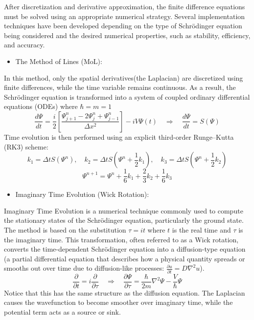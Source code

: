 \documentclass[11pt]{article}
\begin{document}
After discretization and derivative approximation, the finite difference equations must be solved using an appropriate numerical strategy. Several implementation techniques have been developed depending on the type of Schrödinger equation being considered and the desired numerical properties, such as stability, efficiency, and accuracy.

\begin{itemize}
	\item 
	The Method of Lines (MoL):
\end{itemize}
In this method, only the spatial derivatives(the Laplacian) are discretized using finite differences, while the time variable remains continuous. As a result, the Schrödinger equation is transformed into a system of coupled ordinary differential equations (ODEs) where $\hbar = m = 1$
\begin{equation}
	 \frac{d \Psi}{dt} = \frac{i}{2} \left[ \frac{\Psi_{j+1}^n - 2 \Psi_j^n + \Psi_{j-1}^n}{\Delta x^2} \right] - i V \Psi(t) \quad \Rightarrow \quad
	 \frac{d \Psi}{dt} = S(\Psi)
\end{equation}
Time evolution is then performed using an explicit third-order Runge–Kutta (RK3) scheme:
\begin{equation}
	k_1 = \Delta t S(\Psi ^n), \quad 
	k_2 = \Delta t S(\Psi ^n + \frac{1}{2} k_1), \quad 
	k_3 = \Delta t S(\Psi ^n + \frac{1}{2} k_2)
\end{equation}
\begin{equation}
	\Psi^{n+1} = \Psi^n + \frac{1}{6} k_1 +  \frac{2}{3} k_2 + \frac{1}{6} k_3
\end{equation}

\begin{itemize}
	\item 
	Imaginary Time Evolution (Wick Rotation):
\end{itemize}
Imaginary Time Evolution is a numerical technique commonly used to compute the stationary states of the Schrödinger equation, particularly the ground state. The method is based on the substitution $\tau = it$ where $t$ is the real time and $\tau$ is the imaginary time. This transformation, often referred to as a Wick rotation, converts the time-dependent Schrödinger equation into a diffusion-type equation (a partial differential equation that describes how a physical quantity spreads or smooths out over time due to diffusion-like processes: $\frac{\partial u}{\partial t} = D \nabla^2 u$).
\begin{equation}
	\frac{\partial}{\partial t} = i \frac{\partial}{\partial \tau} \quad \Rightarrow \quad
	\frac{\partial \Psi}{\partial \tau} = \frac{\hbar}{2m} \nabla^2 \Psi - \frac{V}{\hbar} \Psi 
\end{equation}
Notice that this has the same structure as the diffusion equation. The Laplacian causes the wavefunction to become smoother over imaginary time, while the potential term acts as a source or sink.
\end{document}
